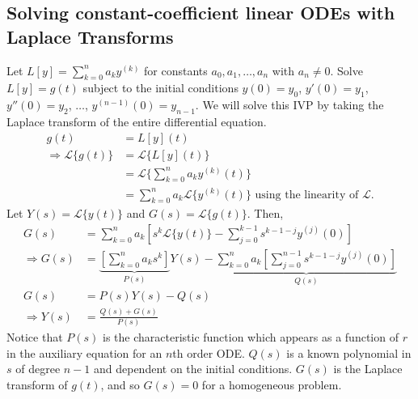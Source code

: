 \documentclass[11pt]{article}
\newcommand{\lap}{\mathcal{L}}
\begin{document}
\subsection{Solving constant-coefficient linear ODEs with Laplace Transforms}
	Let $L[y] = \sum_{k=0}^n a_k y^{(k)}$ for constants $a_0, a_1, \ldots, a_n$ with $a_n \neq 0$. Solve $L[y] = g(t)$ subject to the initial conditions $y(0) = y_0$, $y'(0) = y_1$, $y''(0) = y_2$, $\ldots$, $y^{(n-1)} (0) = y_{n-1}$. We will solve this IVP by taking the Laplace transform of the entire differential equation.
		\begin{align*}
			g(t) &= L[y] (t) \\
			\Rightarrow \lap\{g(t)\} &= \lap\{L[y](t)\} \\
				&= \lap\{ \sum_{k=0}^n a_k y^{(k)} (t)\} \\
				&= \sum_{k=0}^n a_k \lap\{y^{(k)} (t)\} \text{ using the linearity of } \lap.
		\end{align*}
	Let $Y(s) = \lap\{y(t)\}$ and $G(s) = \lap\{g(t)\}$. Then,
		\begin{align*}
			G(s) &= \sum_{k=0}^n a_k \left[s^k \lap\{y(t)\} - \sum_{j=0}^{k-1} s^{k-1-j} y^{(j)} (0) \right] \\
			\Rightarrow G(s) &= \underbrace{\left[\sum_{k=0}^n a_k s^k \right]}_{P(s)} Y(s) - \underbrace{\sum_{k=0}^n a_k \left[\sum_{j=0}^{n-1} s^{k-1-j} y^{(j)} (0) \right]}_{Q(s)} \\
			G(s) &= P(s) Y(s) - Q(s) \\
			\Rightarrow Y(s) &= \frac{Q(s) + G(s)}{P(s)}
		\end{align*}
	Notice that $P(s)$ is the characteristic function which appears as a function of $r$ in the auxiliary equation for an $n$th order ODE. $Q(s)$ is a known polynomial in $s$ of degree $n-1$ and dependent on the initial conditions. $G(s)$ is the Laplace transform of $g(t)$, and so $G(s) = 0$ for a homogeneous problem.
\end{document}
